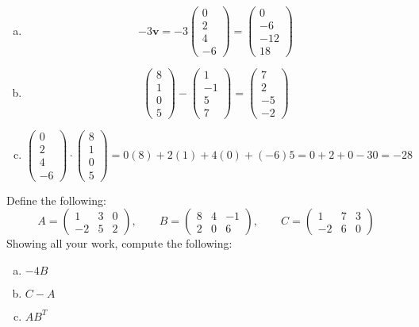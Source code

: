 \documentclass[11pt,letterpaper]{article}
\begin{document}
\sol 
\begin{enumerate}[(a)]
\item 
	\[
	-3\mathbf{v}= -3 \begin{pmatrix} 0 \\ 2 \\ 4 \\ -6 \end{pmatrix}= \begin{pmatrix} 0 \\ -6 \\ -12 \\ 18 \end{pmatrix}
	\]

\item 
	\[
	\begin{pmatrix} 8 \\ 1 \\ 0 \\5 \end{pmatrix} - \begin{pmatrix} 1 \\ -1 \\ 5 \\ 7 \end{pmatrix}= \begin{pmatrix} 7 \\ 2 \\ -5 \\ -2 \end{pmatrix}
	\]

\item 
	\[
	\begin{pmatrix} 0 \\ 2 \\ 4 \\ -6 \end{pmatrix} \cdot \begin{pmatrix} 8 \\ 1 \\ 0 \\5 \end{pmatrix}= 0(8) + 2(1) + 4(0) + (-6)5= 0 + 2 + 0 - 30= -28
	\]
\end{enumerate}



\newpage



 Define the following:
	\[
	A= \begin{pmatrix} 1 & 3 & 0 \\ -2 & 5 & 2 \end{pmatrix}, \qquad
	B= \begin{pmatrix} 8 & 4 & -1 \\ 2 & 0 & 6 \end{pmatrix}, \qquad
	C= \begin{pmatrix} 1 & 7 & 3 \\ -2 & 6 & 0 \end{pmatrix}
	\]
Showing all your work, compute the following:
	\begin{enumerate}[(a)]
	\item $-4B$
	\item $C - A$
	\item $AB^T$
	\end{enumerate} \pspace
	
\end{document}
